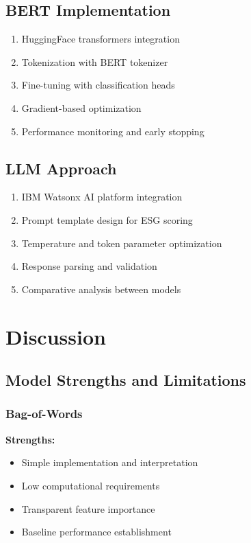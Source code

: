 \documentclass[12pt,a4paper]{article}
\begin{document}
\subsection{BERT Implementation}
\begin{enumerate}
    \item HuggingFace transformers integration
    \item Tokenization with BERT tokenizer
    \item Fine-tuning with classification heads
    \item Gradient-based optimization
    \item Performance monitoring and early stopping
\end{enumerate}

\subsection{LLM Approach}
\begin{enumerate}
    \item IBM Watsonx AI platform integration
    \item Prompt template design for ESG scoring
    \item Temperature and token parameter optimization
    \item Response parsing and validation
    \item Comparative analysis between models
\end{enumerate}

\section{Discussion}

\subsection{Model Strengths and Limitations}

\subsubsection{Bag-of-Words}
\textbf{Strengths:}
\begin{itemize}
    \item Simple implementation and interpretation
    \item Low computational requirements
    \item Transparent feature importance
    \item Baseline performance establishment
\end{itemize}
\end{document}
